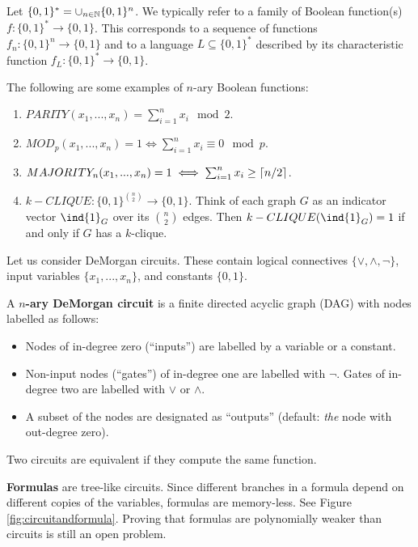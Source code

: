 \documentclass[11pt]{article}
\begin{document}
Let $\{0,1\}^* = \cup_{n \in \mathbb{N}} \{0,1\}^n$. We typically refer to a family of Boolean function(s) $f: \{0,1\}^* \rightarrow \{0,1\}$. This corresponds to a sequence of functions $f_n: \{0,1\}^n \rightarrow \{0,1\}$ and to a language $L \subseteq \{0, 1\}^*$ described by its characteristic function $f_L: \{0,1\}^* \rightarrow \{0,1\}$.

\begin{example}
	The following are some examples of $n$-ary Boolean functions:
	\begin{enumerate}
		\item $PARITY(x_1, ..., x_n) = \sum_{i = 1}^{n} x_i \mod 2$.
		\item $MOD_p(x_1, ..., x_n) = 1 \iff \sum_{i = 1}^{n} x_i \equiv 0 \mod p$.
		\item $MAJORITY_n(x_1, ..., x_n) = 1 \iff \sum_{i=1}^{n} x_i \geq \lceil n/2\rceil$.
		\item $k-CLIQUE: \{0,1\}^{\binom{n}{2}} \rightarrow \{0,1\}$. Think of each graph $G$ as an indicator vector $\ind{1}_G$ over its $\binom{n}{2}$ edges. Then $k-CLIQUE(\ind{1}_G) = 1$ if and only if $G$ has a $k$-clique.
	\end{enumerate}
\end{example}

Let us consider DeMorgan circuits. These contain logical connectives $\{\lor, \land, \lnot\}$, input variables $\{x_1, ..., x_n\}$, and constants $\{0,1\}$. 

\begin{definition}
	\label{def:demorgancircuit}
	A \textbf{$n$-ary DeMorgan circuit} is a finite directed acyclic graph (DAG) with nodes labelled as follows:
	\begin{itemize}
		\item Nodes of in-degree zero (``inputs'') are labelled by a variable or a constant.
		\item Non-input nodes (``gates'') of in-degree one are labelled with $\lnot$. Gates of in-degree two are labelled with $\lor$ or $\land$.
		\item A subset of the nodes are designated as ``outputs'' (default: \emph{the} node with out-degree zero).
	\end{itemize}
	Two circuits are equivalent if they compute the same function.
\end{definition}

\textbf{Formulas} are tree-like circuits. Since different branches in a formula depend on different copies of the variables, formulas are memory-less. See Figure \ref{fig:circuitandformula}. Proving that formulas are polynomially weaker than circuits is still an open problem.
\end{document}
